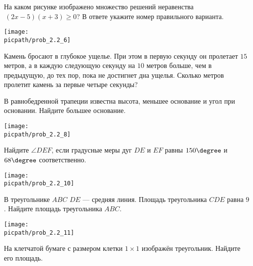 \begin{training}[1]
\begin{listofex}[resume]
		\item На каком рисунке изображено множество решений неравенства\\ \( (2x-5)(x+3)\ge0 \)? В ответе укажите номер правильного варианта.
		\begin{center}
			\texttt{[image: \\picpath/prob\_2.2\_6]}
		\end{center}
		\foranswer
		\item Камень бросают в глубокое ущелье. При этом в первую секунду он пролетает \( 15 \) метров, а в каждую следующую секунду на \( 10 \) метров больше, чем в предыдущую, до тех пор, пока не достигнет дна ущелья. Сколько метров пролетит камень за первые четыре секунды?
		\foranswer
		\item \begin{minipage}[t]{\bodywidth}
			В равнобедренной трапеции известна высота, меньшее основание и угол при основании. Найдите большее основание.
			\foranswer
		\end{minipage}
		\gapwidth
		\begin{minipage}[t]{\picwidth}
			\texttt{[image: \\picpath/prob\_2.2\_8]}
		\end{minipage}
		\item \begin{minipage}[t]{\bodywidth}
			Найдите \( \angle DEF \), если градусные меры дуг \( DE \) и \( EF \) равны \( 150\degree \) и \( 68\degree \) соответственно.
			\foranswer
		\end{minipage}
		\gapwidth
		\begin{minipage}[t]{\picwidth}
			\texttt{[image: \\picpath/prob\_2.2\_10]}
		\end{minipage}
		\item \begin{minipage}[t]{\bodywidth}
		В треугольнике \( ABC \) \( DE \) --- средняя линия. Площадь треугольника \( CDE \) равна \( 9 \). Найдите площадь треугольника \( ABC \).
			\foranswer
		\end{minipage}
		\gapwidth
		\begin{minipage}[t]{\picwidth}
			\texttt{[image: \\picpath/prob\_2.2\_11]}
		\end{minipage}
		\item \begin{minipage}[t]{\bodywidth}
			На клетчатой бумаге с размером клетки \( 1\times1 \) изображён треугольник. Найдите его площадь.
			\foranswer
		\end{minipage}

\end{listofex}
\end{training}
